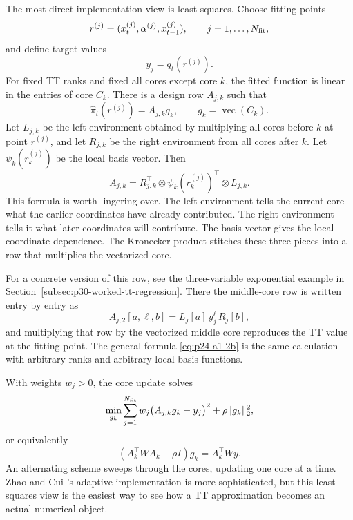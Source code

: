 \documentclass[11pt]{article}
\numberwithin{equation}{section}
\newcommand{\vecop}{\operatorname{vec}}
\begin{document}
The most direct implementation view is least squares.  Choose fitting points
\[
    r^{(j)}=(x_t^{(j)},\alpha^{(j)},x_{t-1}^{(j)}),
    \qquad j=1,\ldots,N_{\rm fit},
\]
and define target values
\[
    y_j=q_t(r^{(j)}).
\]
For fixed TT ranks and fixed all cores except core \(k\), the fitted function is
linear in the entries of core \(C_k\).  There is a design row \(A_{j,k}\) such
that
\begin{equation}
    \widehat\pi_t(r^{(j)})=A_{j,k}g_k,
    \qquad g_k=\vecop(C_k).
    \label{eq:p24-a1-2a}
\end{equation}
Let \(L_{j,k}\) be the left environment obtained by multiplying all cores before
\(k\) at point \(r^{(j)}\), and let \(R_{j,k}\) be the right environment from
all cores after \(k\).  Let
\(\psi_k(r_k^{(j)})\) be the local basis vector.  Then
\begin{equation}
    A_{j,k}
    =
    R_{j,k}^{\top}\otimes \psi_k(r_k^{(j)})^\top\otimes L_{j,k}.
    \label{eq:p24-a1-2b}
\end{equation}
This formula is worth lingering over.  The left environment tells the current
core what the earlier coordinates have already contributed.  The right
environment tells it what later coordinates will contribute.  The basis vector
gives the local coordinate dependence.  The Kronecker product stitches these
three pieces into a row that multiplies the vectorized core.

For a concrete version of this row, see the three-variable exponential example
in Section~\ref{subsec:p30-worked-tt-regression}.  There the middle-core row
is written entry by entry as
\[
    A_{j,2}[a,\ell,b]=L_j[a]\,y_j^\ell\,R_j[b],
\]
and multiplying that row by the vectorized middle core reproduces the TT value
at the fitting point.  The general formula \eqref{eq:p24-a1-2b} is the same
calculation with arbitrary ranks and arbitrary local basis functions.

With weights \(w_j>0\), the core update solves
\begin{equation}
    \min_{g_k}
    \sum_{j=1}^{N_{\rm fit}}w_j\bigl(A_{j,k}g_k-y_j\bigr)^2
    +\rho\|g_k\|_2^2,
    \label{eq:p24-a1-2c}
\end{equation}
or equivalently
\begin{equation}
    (A_k^\top W A_k+\rho I)g_k=A_k^\top Wy.
    \label{eq:p24-a1-2d}
\end{equation}
An alternating scheme sweeps through the cores, updating one core at a time.
Zhao and Cui \cite{zhao2024ttsequential}'s adaptive implementation is more sophisticated, but this least-
squares view is the easiest way to see how a TT approximation becomes an
actual numerical object.
\end{document}

